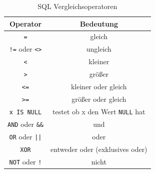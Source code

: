 \begin{table}[h]
\centering
\begin{tabular}{|c|c|}
\hline
\textbf{Operator} & \textbf{Bedeutung}\\ \hline
{\lstinline|=|} & gleich \\ \hline
{\lstinline|!=|} oder {\lstinline|<>|} & ungleich \\ \hline
{\lstinline|<|} & kleiner \\ \hline
{\lstinline|>|} & größer \\ \hline
{\lstinline|<=|} & kleiner oder gleich \\ \hline
{\lstinline|>=|} & größer oder gleich \\ \hline
{\lstinline|x IS NULL|} & testet ob x den Wert {\lstinline|NULL|} hat \\ \hline
{\lstinline|AND|} oder {\lstinline|&&|} & und \\ \hline
{\lstinline|OR|} oder {\lstinline!||!} & oder \\ \hline
{\lstinline|XOR|} & entweder oder (exklusives oder) \\ \hline
{\lstinline|NOT|} oder {\lstinline|!|} & nicht \\ \hline
\end{tabular}
\caption{SQL Vergleichsoperatoren}
\label{tab:sql-vergleichsoperatoren}
\end{table}

